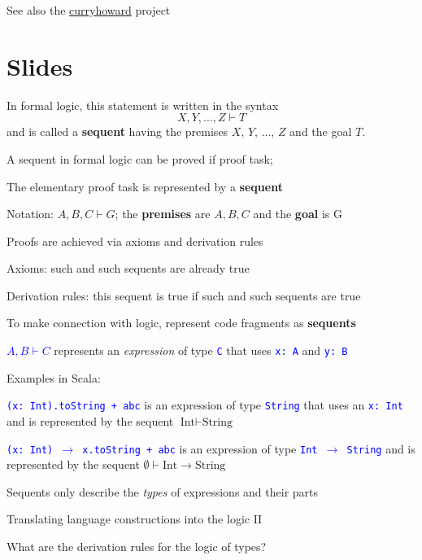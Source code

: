 See also the \href{https://github.com/Chymyst/curryhoward}{curryhoward}
project

\section{Slides}

In formal logic, this statement is written in the syntax
\[
X,Y,...,Z\vdash T
\]
and is called a \textbf{sequent} having
the premises $X$, $Y$, ..., $Z$ and the goal $T$.

A sequent in formal logic can be proved if proof task;

The elementary proof task is represented by a \textbf{sequent}

Notation: $A,B,C\vdash G$; the \textbf{premises} are $A,B,C$ and
the \textbf{goal} is G

Proofs are achieved via axioms and derivation rules

Axioms: such and such sequents are already true

Derivation rules: this sequent is true if such and such sequents are
true

To make connection with logic, represent code fragments as \textbf{sequents}

\textcolor{blue}{$A,B\vdash C$} represents an \emph{expression} of
type \texttt{\textcolor{blue}{\footnotesize{}C}} that uses \texttt{\textcolor{blue}{\footnotesize{}x:\ A}}
and \texttt{\textcolor{blue}{\footnotesize{}y:\ B}}{\footnotesize\par}

Examples in Scala:

\texttt{\textcolor{blue}{\footnotesize{}(x:\ Int).toString + \textquotedbl abc\textquotedbl}}
is an expression of type \texttt{\textcolor{blue}{\footnotesize{}String}}
that uses an \texttt{\textcolor{blue}{\footnotesize{}x:\ Int}} and
is represented by the sequent $\text{Int}\vdash\text{String}$

\texttt{\textcolor{blue}{\footnotesize{}(x:\ Int) $\rightarrow$
x.toString + \textquotedbl abc\textquotedbl}} is an expression
of type \texttt{\textcolor{blue}{\footnotesize{}Int $\rightarrow$
String}} and is represented by the sequent $\emptyset\vdash\text{Int}\rightarrow\text{String}$

Sequents only describe the \emph{types} of expressions and their parts

Translating language constructions into the logic II

What are the derivation rules for the logic of types?

